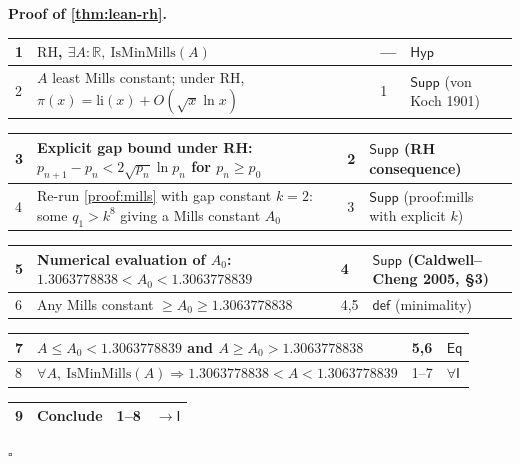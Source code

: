 \documentclass[11pt,reqno]{amsart}
\theoremstyle{blueplain}
\renewcommand{\qedsymbol}{\textcolor{proofqed}{\ensuremath{\square}}}
\renewenvironment{proof}[1][Proof]{\par\noindent\textbf{\textcolor{proofhead}{#1.}}\par\nobreak}{\par\nobreak\hfill\qedsymbol}
\numberwithin{equation}{section}
\begin{document}
\begin{proof}[\textbf{Proof of \cref{thm:lean-rh}}]
\label{proof:lean-rh}
{\scriptsize
\begin{tabular}{|m{0.7cm}|m{12cm}|m{1.4cm}|m{2.5cm}|}
\hline
1 & $\mathrm{RH}$, $\exists A:\mathbb{R},\ \mathrm{IsMinMills}(A)$ & --- & $\mathsf{Hyp}$ \\ \hline
2 & $A$ least Mills constant; under RH, $\pi(x)=\mathrm{li}(x)+O(\sqrt{x}\ln x)$ & 1 & $\mathsf{Supp}$ (von Koch 1901) \\
\end{tabular}%
\noindent \newline
\noindent
\begin{tabular}{|m{0.7cm}|m{12cm}|m{1.4cm}|m{2.5cm}|}
\hline
3 & Explicit gap bound under RH: $p_{n+1}-p_n<2\sqrt{p_n}\ln p_n$ for $p_n\ge p_0$ & 2 & $\mathsf{Supp}$ (RH consequence) \\ \hline
4 & Re-run \cref{proof:mills} with gap constant $k=2$: some $q_1>k^8$ giving a Mills constant $A_0$ & 3 & $\mathsf{Supp}$ (proof:mills with explicit $k$) \\
\end{tabular}%
\noindent \newline
\noindent
\begin{tabular}{|m{0.7cm}|m{12cm}|m{1.4cm}|m{2.5cm}|}
\hline
5 & Numerical evaluation of $A_0$: $1.3063778838<A_0<1.3063778839$ & 4 & $\mathsf{Supp}$ (Caldwell--Cheng 2005, \S 3) \\ \hline
6 & Any Mills constant $\ge A_0\ge 1.3063778838$ & 4,5 & $\mathsf{def}$ (minimality) \\
\end{tabular}%
\noindent \newline
\noindent
\begin{tabular}{|m{0.7cm}|m{12cm}|m{1.4cm}|m{2.5cm}|}
\hline
7 & $A\le A_0<1.3063778839$ and $A\ge A_0>1.3063778838$ & 5,6 & $\mathsf{Eq}$ \\ \hline
8 & $\forall A,\ \mathrm{IsMinMills}(A)\Rightarrow 1.3063778838<A<1.3063778839$ & 1--7 & $\forall\mathsf{I}$ \\
\end{tabular}%
\noindent \newline
\noindent
\begin{tabular}{|m{0.7cm}|m{12cm}|m{1.4cm}|m{2.5cm}|}
\hline
9 & Conclude & 1--8 & $\rightarrow\mathsf{I}$ \\ \hline
\end{tabular}%
}
\end{proof}
\end{document}
